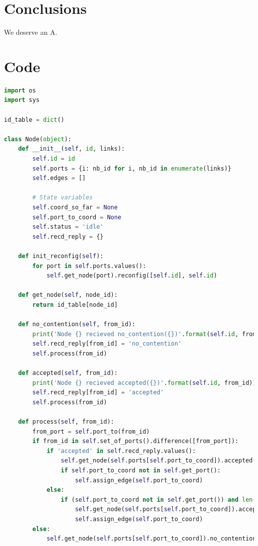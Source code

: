 \documentclass[a4paper,12pt]{article}
\newcommand{\<}{\langle}
\renewcommand{\>}{\rangle}
\theoremstyle{definition}
\begin{document}
\section{Conclusions}

We deserve an A. 



\printbibliography
\newpage
\appendix
\section{Code}

\begin{lstlisting}[language=python, caption={Color quantization program}, label={main_1}, basicstyle=\small]
import os
import sys

id_table = dict()

class Node(object):
    def __init__(self, id, links):
        self.id = id
        self.ports = {i: nb_id for i, nb_id in enumerate(links)}
        self.edges = []

        # State variables
        self.coord_so_far = None
        self.port_to_coord = None
        self.status = 'idle'
        self.recd_reply = {}

    def init_reconfig(self):
        for port in self.ports.values():
            self.get_node(port).reconfig([self.id], self.id)

    def get_node(self, node_id):
        return id_table[node_id]

    def no_contention(self, from_id):
        print('Node {} recieved no_contention({})'.format(self.id, from_id))
        self.recd_reply[from_id] = 'no_contention'
        self.process(from_id)

    def accepted(self, from_id):
        print('Node {} recieved accepted({})'.format(self.id, from_id))
        self.recd_reply[from_id] = 'accepted'
        self.process(from_id)

    def process(self, from_id):
        from_port = self.port_to(from_id)
        if from_id in self.set_of_ports().difference([from_port]):
            if 'accepted' in self.recd_reply.values():
                self.get_node(self.ports[self.port_to_coord]).accepted(self.id)
                if self.port_to_coord not in self.get_port():
                    self.assign_edge(self.port_to_coord)
            else:
                if (self.port_to_coord not in self.get_port()) and len(self.set_of_ports().difference([self.port_to_coord]).intersection(self.get_port()))!=0:
                    self.get_node(self.ports[self.port_to_coord]).accepted(self.id)
                    self.assign_edge(self.port_to_coord)
        else:
            self.get_node(self.ports[self.port_to_coord]).no_contention(self.id)


\end{lstlisting}
\end{document}
